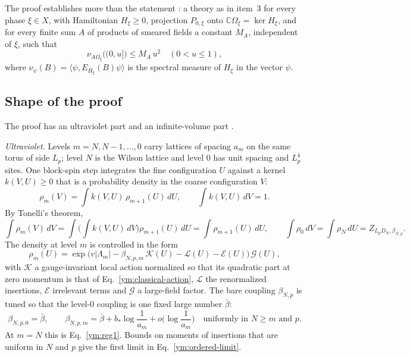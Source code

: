 The proof establishes more than the statement
\cite{Armstrong2026,YMGroup2026}: a theory as in item~3 for every phase
$\xi\in X$, with Hamiltonian $H_\xi\ge0$, projection $P_{0,\xi}$ onto
$\mathbb C\Omega_\xi=\ker H_\xi$, and for every finite sum $A$ of products of
smeared fields a constant $M_A$, independent of $\xi$, such that
\begin{equation}\label{ym:low-energy}
 \nu_{A\Omega_\xi}\big((0,u]\big)\le M_A\,u^2\quad(0<u\le1),
\end{equation}
where $\nu_\psi(B)=\langle\psi,E_{H_\xi}(B)\psi\rangle$ is the spectral
measure of $H_\xi$ in the vector $\psi$.

\subsection{Shape of the proof}
The proof has an ultraviolet part and an infinite-volume part
\cite{Armstrong2026}.

\emph{Ultraviolet.} Levels $m=N,N-1,\dots,0$ carry lattices of spacing
$a_m$ on the same torus of side $L_p$; level $N$ is the Wilson lattice and
level $0$ has unit spacing and $L_p^4$ sites. One block-spin step integrates
the fine configuration $U$ against a kernel $k(V,U)\ge0$ that is a
probability density in the coarse configuration $V$:
\begin{equation}\label{ym:block-step}
 \rho_m(V)=\int k(V,U)\,\rho_{m+1}(U)\,dU,\qquad\int k(V,U)\,dV=1 .
\end{equation}
By Tonelli's theorem,
\begin{equation}\label{ym:partition-preserved}
 \int\rho_m(V)\,dV=\int\Big(\int k(V,U)\,dV\Big)\rho_{m+1}(U)\,dU
 =\int\rho_{m+1}(U)\,dU,\qquad
 \int\rho_0\,dV=\int\rho_N\,dU=Z_{L_pD_N,\beta_{N,p}} .
\end{equation}
The density at level $m$ is controlled in the form
\begin{equation}\label{ym:effective-density}
 \rho_m(U)=\exp\big(v|\Lambda_m|-\beta_{N,p,m}\,\mathcal K(U)-\mathcal L(U)
 -\mathcal E(U)\big)\,\mathcal G(U),
\end{equation}
with $\mathcal K$ a gauge-invariant local action normalized so that its
quadratic part at zero momentum is that of Eq.~\eqref{ym:classical-action},
$\mathcal L$ the renormalized insertions, $\mathcal E$ irrelevant terms and
$\mathcal G$ a large-field factor. The bare coupling $\beta_{N,p}$ is tuned
so that the level-$0$ coupling is one fixed large number $\bar\beta$:
\begin{equation}\label{ym:running}
 \beta_{N,p,0}=\bar\beta,\qquad
 \beta_{N,p,m}=\bar\beta+b_*\log\frac{1}{a_m}+o\Big(\log\frac{1}{a_m}\Big)
 \quad\text{uniformly in }N\ge m\text{ and }p .
\end{equation}
At $m=N$ this is Eq.~\eqref{ym:reg1}. Bounds on moments of insertions that
are uniform in $N$ and $p$ give the first limit in
Eq.~\eqref{ym:ordered-limit}.

